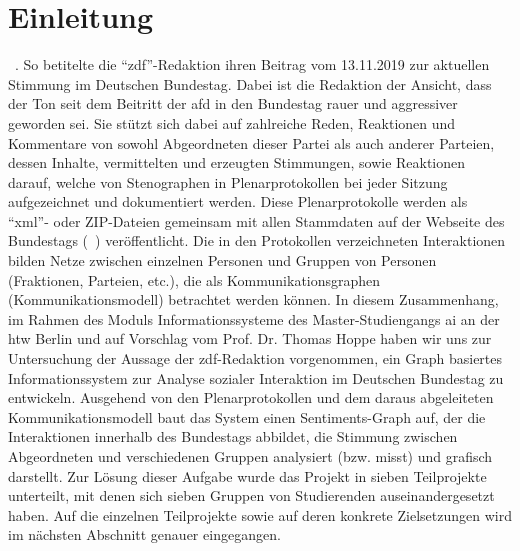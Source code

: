 \section{Einleitung}\label{sec:01_01_einleitung}
~\cite{TonImBundesTag2019}. So betitelte die
\enquote{\gls{zdf}}-Redaktion ihren Beitrag vom 13.11.2019 zur aktuellen Stimmung im
Deutschen Bundestag. Dabei ist die Redaktion der Ansicht, dass der Ton
seit dem Beitritt der \gls{afd} in den Bundestag rauer und aggressiver geworden
sei. Sie stützt sich dabei auf zahlreiche Reden, Reaktionen und Kommentare
von sowohl Abgeordneten dieser Partei als auch anderer Parteien,
dessen Inhalte, vermittelten und erzeugten Stimmungen, sowie Reaktionen
darauf, welche von Stenographen in Plenarprotokollen bei jeder Sitzung
aufgezeichnet und dokumentiert werden. Diese Plenarprotokolle werden als \enquote{\gls{xml}}-
oder ZIP-Dateien gemeinsam mit allen Stammdaten auf der Webseite des Bundestags
(~\cite{OpenData2019}) veröffentlicht. Die in den Protokollen
verzeichneten Interaktionen bilden Netze 
zwischen einzelnen Personen und Gruppen von Personen (Fraktionen, Parteien,
etc.), die als Kommunikationsgraphen (Kommunikationsmodell) betrachtet werden
können. In diesem Zusammenhang, im Rahmen des Moduls Informationssysteme des
Master-Studiengangs \gls{ai} an der \gls{htw} Berlin und auf Vorschlag vom
Prof. Dr. Thomas Hoppe haben wir uns zur Untersuchung der Aussage der
\gls{zdf}-Redaktion vorgenommen, ein Graph
basiertes Informationssystem zur Analyse sozialer Interaktion im Deutschen Bundestag
zu entwickeln. Ausgehend von den Plenarprotokollen und dem daraus
abgeleiteten Kommunikationsmodell baut das System einen Sentiments-Graph auf,
der die Interaktionen innerhalb des Bundestags abbildet, die Stimmung zwischen
Abgeordneten und verschiedenen Gruppen analysiert (bzw. misst) und grafisch
darstellt. Zur Lösung dieser Aufgabe wurde das Projekt in sieben Teilprojekte
unterteilt, mit denen sich sieben Gruppen von Studierenden auseinandergesetzt
haben. Auf die einzelnen Teilprojekte sowie auf deren konkrete Zielsetzungen
wird im nächsten Abschnitt genauer eingegangen.